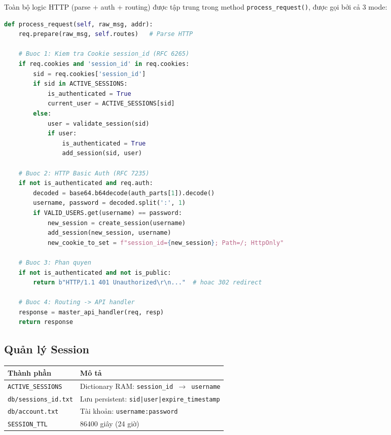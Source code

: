 \documentclass[12pt,a4paper]{article}
\begin{document}
Toàn bộ logic HTTP (parse + auth + routing) được tập trung trong method \texttt{process\_request()}, được gọi bởi cả 3 mode:

\begin{lstlisting}[language=Python, caption={process\_request() --- loi HTTP da dung chung}]
def process_request(self, raw_msg, addr):
    req.prepare(raw_msg, self.routes)   # Parse HTTP

    # Buoc 1: Kiem tra Cookie session_id (RFC 6265)
    if req.cookies and 'session_id' in req.cookies:
        sid = req.cookies['session_id']
        if sid in ACTIVE_SESSIONS:
            is_authenticated = True
            current_user = ACTIVE_SESSIONS[sid]
        else:
            user = validate_session(sid)
            if user:
                is_authenticated = True
                add_session(sid, user)

    # Buoc 2: HTTP Basic Auth (RFC 7235)
    if not is_authenticated and req.auth:
        decoded = base64.b64decode(auth_parts[1]).decode()
        username, password = decoded.split(':', 1)
        if VALID_USERS.get(username) == password:
            new_session = create_session(username)
            add_session(new_session, username)
            new_cookie_to_set = f"session_id={new_session}; Path=/; HttpOnly"

    # Buoc 3: Phan quyen
    if not is_authenticated and not is_public:
        return b"HTTP/1.1 401 Unauthorized\r\n..."  # hoac 302 redirect

    # Buoc 4: Routing -> API handler
    response = master_api_handler(req, resp)
    return response
\end{lstlisting}

\subsection{Quản lý Session}

\begin{longtable}{|p{4.5cm}|p{10.5cm}|}
\hline
\textbf{Thành phần} & \textbf{Mô tả} \\ \hline
\texttt{ACTIVE\_SESSIONS} & Dictionary RAM: \texttt{session\_id $\rightarrow$ username} \\ \hline
\texttt{db/sessions\_id.txt} & Lưu persistent: \texttt{sid|user|expire\_timestamp} \\ \hline
\texttt{db/account.txt} & Tài khoản: \texttt{username:password} \\ \hline
\texttt{SESSION\_TTL} & 86400 giây (24 giờ) \\ \hline
\end{longtable}
\end{document}
